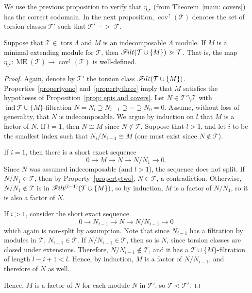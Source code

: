 \documentclass[ALCO,ThmDefs,Unicode,epreuves]{cedram}
\DeclareMathOperator{\tors}{tors}
\DeclareMathOperator{\ME}{ME}%
\DeclareMathOperator{\ind}{ind}
\DeclareMathOperator{\cov}{cov}
\newcommand{\calT}{\mathcal{T}}
\newcommand{\filt}{\mathscr{F}\Mk ilt}
\newcommand{\covers}{{\,\,\,\cdot\!\!\!\! >\,\,}}
\newcommand{\covup}{\cov^{\uparrow}}
\renewcommand{\1}{\hat{1}}
\newcommand{\0}{\hat{0}}
\newcommand*{\Mk}{\mkern -2mu}
\begin{document}
We use the previous proposition to verify that $\eta_\calT$ (from Theorem~\ref{main: covers}) has the correct codomain.
In the next proposition, $\covup(\calT)$ denotes the set of torsion classes $\calT'$ such that $\calT' \covers \calT$.
\begin{proposition}\label{thm:pseudo-minimal-covers}
Suppose that $\calT\in \tors \Lambda$ and $M$ is an indecomposable $\Lambda$ module.
If $M$ is a minimal extending module for $\calT$, then $\filt(\calT \cup \{M\})\covers \calT$.
That is, the map $\eta_\calT: \ME(\calT) \to \covup(\calT)$ is well-defined.
\end{proposition}
\begin{proof}
Again, denote by $\calT'$ the torsion class $\filt(\calT\cup \{M\})$. 
Properties~\ref{propertyone} and~\ref{propertythree} imply that $M$ satisfies the hypotheses of Proposition~\ref{prop: epis and covers}.
Let $N\in \calT' \setminus \calT$ with $\ind \calT \cup \{M\}$-filtration $N=N_l\supsetneq N_{l-1} \supsetneq \cdots
 \supsetneq N_0=0$. Assume, without loss of generality, that $N$ is indecomposable. 
We argue by induction on $l$ that $M$ is a factor of $N$.
If $l=1$, then $N\cong M$ since $N\notin \calT$.
Suppose that $l>1$, and let $i$ to be the smallest index such that $N_i/N_{i-1} \cong M$ (one must exist since $N\notin
 \calT$).

If $i=1$, then there is a short exact sequence 
\[0 \rightarrow M \rightarrow N \rightarrow N/N_1 \rightarrow 0.\]
Since $N$ was assumed indecomposable (and $l>1$), the sequence does
not split.
If $N/N_1 \in \calT$, then by Property~\ref{propertytwo}, $N\in
\calT$, a contradiction.
Otherwise, $N/N_1 \not\in \calT$ is in $\filt^{(l-1)}(\calT\cup \{M\})$,
so by induction, $M$ is a factor of $N/N_1$, so it is also a factor of
$N$. 

If $i>1$, consider the short exact sequence 
\[0 \rightarrow N_{i-1} \rightarrow N \rightarrow N/N_{i-1} \rightarrow 0\]
which again is non-split by assumption.
Note that since $N_{i-1}$ has a filtration by modules in $\calT$, $N_{i-1}\in
\calT$. 
If $N/N_{i-1}\in \calT$, then so is $N$, since torsion classes are
closed under extensions. 
Therefore, $N/N_{i-1} \notin \calT$, and it has a
$\calT\cup\{M\}$-filtration of length $l-i+1<l$.
Hence, by induction, $M$ is a factor of $N/N_{i-1}$, and therefore of $N$ as well. 

Hence, $M$ is a factor of $N$ for each module $N$ in
$\calT'$, so $\calT\lessdot \calT'$. 
\end{proof}
\end{document}
